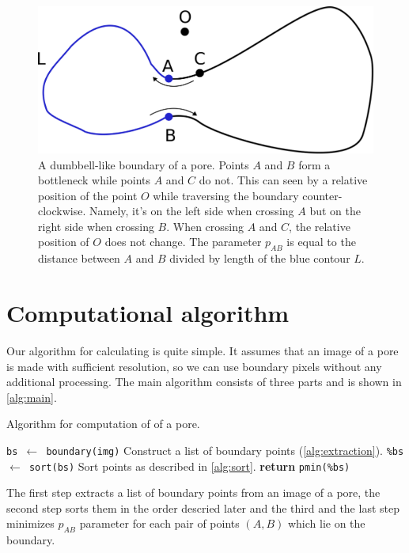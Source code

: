 \documentclass[reprint,amsmath,amssymb,aps,pre,showkeys,showpacs]{revtex4-1}
\newcommand{\highlight}[1]{{\color{red}{#1}}} %
\begin{document}
\begin{figure}
  \centering
  \includegraphics[width=0.9\linewidth]{images/parameter.png}
  \caption[]{A dumbbell-like boundary of a pore. Points $A$ and $B$ form a
    bottleneck while points $A$ and $C$ do not. This can seen by a relative
    position of the point $O$ while traversing the boundary
    counter-clockwise. Namely, it's on the left side when crossing $A$ but on
    the right side when crossing $B$. When crossing $A$ and $C$, the relative
    position of $O$ does not change. The parameter $p_{AB}$ is equal to the
    distance between $A$ and $B$ divided by length of the blue contour $L$.}
  \label{fig:parameter}
\end{figure}

\section{Computational algorithm}
\label{seq:alg}
Our algorithm for calculating \highlight{awesomeness} is quite simple. It
assumes that an image of a pore is made with sufficient resolution, so we can
use boundary pixels without any additional processing. The main algorithm
consists of three parts and is shown in \cref{alg:main}.
\begin{algorithm}[H]
  \caption{Algorithm for computation of \highlight{awesomeness} of a pore.}
  \label{alg:main}
  \begin{algorithmic}[1]
    \State \texttt{bs $\gets$ boundary(img)}
    \Comment Construct a list of boundary points (\cref{alg:extraction}).
    \State \texttt{\%bs $\gets$ sort(bs)}
    \Comment Sort points as described in \cref{alg:sort}.
    \State \textbf{return} \texttt{pmin(\%bs)}
    \EndProcedure
  \end{algorithmic}
\end{algorithm}

The first step extracts a list of boundary points from an image of a pore, the
second step sorts them in the order descried later and the third and the last
step minimizes $p_{AB}$ parameter for each pair of points $(A, B)$ which lie on
the boundary.
\end{document}
